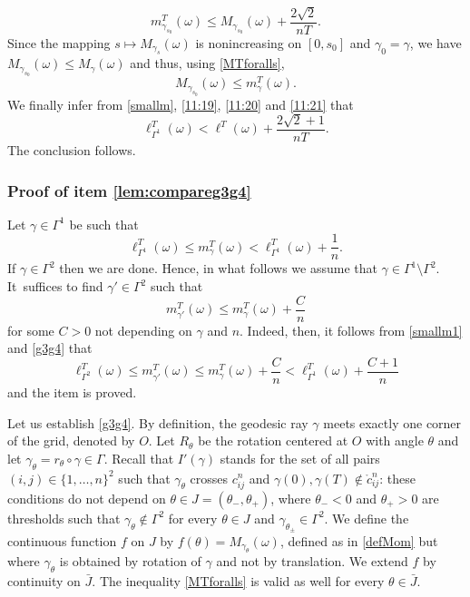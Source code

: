 \documentclass[JEP,XML,SOM,Unicode, NoEqCountersInSection,NoFloatCountersInSection,published]{cedram}
\theoremstyle{definition}
\begin{document}
\begin{equation}\label{11:20}
m^T_{\gamma_{s_0}} (\omega) \leq M_{\gamma_{s_0}} (\omega) + \frac{2 \sqrt{2}}{nT}.
\end{equation}
Since the mapping $s\mapsto M_{\gamma_s}(\omega)$ is nonincreasing on $[0,s_0]$ and $\gamma_0=\gamma$, we have $M_{\gamma_{s_0}} (\omega) \leq M_{\gamma} (\omega)$ and thus, using \eqref{MTforalls},
\begin{equation}\label{11:21}
M_{\gamma_{s_0}} (\omega) \leq m^T_\gamma(\omega).
\end{equation}
We finally infer from \eqref{smallm}, \eqref{11:19}, \eqref{11:20} and \eqref{11:21} that
\[
\ell_{\Gamma^1}^T(\omega) < \ell^T(\omega)+\frac{2 \sqrt{2}+ 1}{nT}.
\]
The conclusion follows.

\subsubsection*{Proof of item \eqref{lem:compareg3g4}}
Let $\gamma\in\Gamma^1$ be such that
\begin{equation} \label{smallm1}
\ell^T_{\Gamma^1}(\omega)\leq m^T_\gamma(\omega) < \ell^T_{\Gamma^1}(\omega) + \frac{1}{n}.
\end{equation}
If $\gamma\in\Gamma^2$ then we are done. Hence, in what follows we assume that $\gamma \in \Gamma^1 \setminus \Gamma^2$. It~suffices to find $\gamma' \in \Gamma^2$ such that
\begin{equation} \label{g3g4}
m^T_{\gamma'} (\omega) \leq m^T_{\gamma}(\omega) + \frac{C}{n}
\end{equation}
for some $C >0$ not depending on $\gamma$ and $n$. Indeed, then, it follows from \eqref{smallm1} and \eqref{g3g4} that
\[
\ell^T_{\Gamma^2}(\omega)\leq m^T_{\gamma'} (\omega)\leq m^T_{\gamma}(\omega) + \frac{C}{n}< \ell^T_{\Gamma^1}(\omega) + \frac{C+1}{n}
\]
and the item is proved.

Let us establish \eqref{g3g4}.
By definition, the geodesic ray $\gamma$ meets exactly one corner of the grid, denoted by $O$.
Let $R_\theta$ be the rotation centered at $O$ with angle $\theta$ and let $\gamma_\theta=r_\theta \circ \gamma \in\Gamma$. Recall that $I'(\gamma)$ stands for the set of all pairs $(i,j)\in \{1,\ldots,n\}^2$ such that $\gamma_\theta$ crosses $c_{ij}^n$ and $\gamma(0), \gamma(T) \notin \mathring{c}_{ij}^n$: these conditions do not depend on $\theta \in J= (\theta_-, \theta_+)$, where $\theta_-<0$ and $\theta_+ >0$ are thresholds such that $\gamma_\theta \notin \Gamma^2$ for every $\theta \in J$ and $\gamma_{\theta_\pm} \in \Gamma^2$. We define the {continuous} function $f$ on $J$ by $f(\theta)=M_{\gamma_\theta} (\omega)$, defined as in \eqref{defMom} but where $\gamma_\theta$ is obtained by rotation of $\gamma$ and not by translation. We extend $f$ by continuity on $\bar{J}$. The inequality \eqref{MTforalls} is valid as well for every $\theta\in \bar J$.
\end{document}
